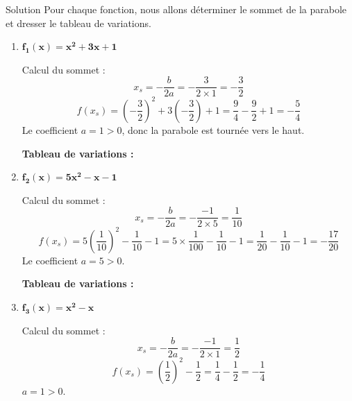 \documentclass[a4paper,12pt]{article}
\begin{document}
\begin{solutionbox}{Solution}
Pour chaque fonction, nous allons déterminer le sommet de la parabole et dresser le tableau de variations.

\begin{enumerate}
    \item \(\boldsymbol{f_1(x) = x^2 + 3x + 1}\)

    Calcul du sommet :
    \[
    x_s = -\dfrac{b}{2a} = -\dfrac{3}{2 \times 1} = -\dfrac{3}{2}
    \]
    \[
    f(x_s) = \left(-\dfrac{3}{2}\right)^2 + 3 \left(-\dfrac{3}{2}\right) + 1 = \dfrac{9}{4} - \dfrac{9}{2} + 1 = -\dfrac{5}{4}
    \]
    Le coefficient \(a = 1 > 0\), donc la parabole est tournée vers le haut.

    \textbf{Tableau de variations :}

    \begin{center}
    \end{center}

    \item \(\boldsymbol{f_2(x) = 5x^2 - x - 1}\)

    Calcul du sommet :
    \[
    x_s = -\dfrac{b}{2a} = -\dfrac{-1}{2 \times 5} = \dfrac{1}{10}
    \]
    \[
    f(x_s) = 5 \left(\dfrac{1}{10}\right)^2 - \dfrac{1}{10} - 1 = 5 \times \dfrac{1}{100} - \dfrac{1}{10} - 1 = \dfrac{1}{20} - \dfrac{1}{10} - 1 = -\dfrac{17}{20}
    \]
    Le coefficient \(a = 5 > 0\).

    \textbf{Tableau de variations :}

    \begin{center}
    \end{center}

    \item \(\boldsymbol{f_3(x) = x^2 - x}\)

    Calcul du sommet :
    \[
    x_s = -\dfrac{b}{2a} = -\dfrac{-1}{2 \times 1} = \dfrac{1}{2}
    \]
    \[
    f(x_s) = \left(\dfrac{1}{2}\right)^2 - \dfrac{1}{2} = \dfrac{1}{4} - \dfrac{1}{2} = -\dfrac{1}{4}
    \]
    \(a = 1 > 0\).


\end{enumerate}
\end{solutionbox}
\end{document}
